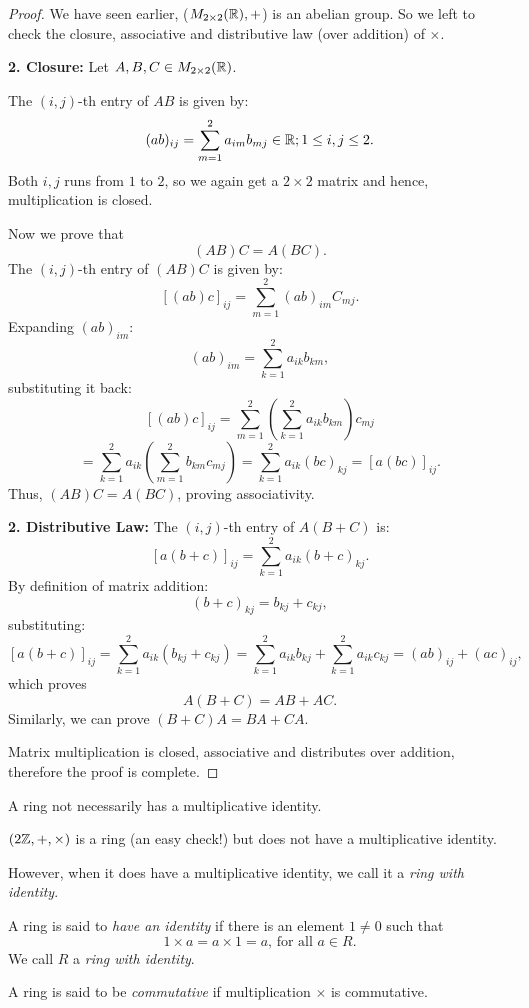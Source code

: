 \begin{proof}
    We have seen earlier, ($M_{2\times 2}(\mathbb{R}), +$) is an abelian group. So we left to check the closure, associative and distributive law (over addition) of $\times$.
    
    \textbf{2. Closure:} Let $A, B, C \in M_{2\times 2}(\mathbb{R})$.

    The $(i,j)$-th entry of $AB$ is given by:
    \[
    (ab)_{ij} = \sum_{m=1}^{2} a_{im} b_{mj} \in \mathbb{R}; 1 \leq i,j \leq 2.
    \]
    Both $i, j$ runs from $1$ to $2$, so we again get a $2\times 2$ matrix and hence, multiplication is closed.

    Now we prove that
    \[ (AB)C = A(BC). \]
    The $(i,j)$-th entry of $(AB)C$ is given by:
    \[
    [(ab)c]_{ij} = \sum_{m=1}^{2} (ab)_{im} C_{mj}.
    \]
    Expanding $(ab)_{im}$:
    \[
    (ab)_{im} = \sum_{k=1}^{2} a_{ik} b_{km},
    \]
    substituting it back:
    \[
    [(ab)c]_{ij} = \sum_{m=1}^{2} \left( \sum_{k=1}^{2} a_{ik} b_{km} \right) c_{mj}
    \]
    \[
    = \sum_{k=1}^{2} a_{ik} \left( \sum_{m=1}^{2} b_{km} c_{mj} \right) = \sum_{k=1}^{2} a_{ik} (bc)_{kj} = [a(bc)]_{ij}.
    \]
    Thus, $(AB)C = A(BC)$, proving associativity.

    \textbf{2. Distributive Law:} 
    The $(i,j)$-th entry of $A(B+C)$ is:
    \[
    [a(b+c)]_{ij} = \sum_{k=1}^{2} a_{ik} (b+c)_{kj}.
    \]
    By definition of matrix addition:
    \[
    (b+c)_{kj} = b_{kj} + c_{kj},
    \]
    substituting:
    \[
    [a(b+c)]_{ij} = \sum_{k=1}^{2} a_{ik} (b_{kj} + c_{kj}) = \sum_{k=1}^{2} a_{ik} b_{kj} + \sum_{k=1}^{2} a_{ik} c_{kj} = (ab)_{ij} + (ac)_{ij},
    \]
    which proves
    \[
    A(B+C) = AB + AC.
    \]
    Similarly, we can prove $(B+C)A = BA + CA$.

    Matrix multiplication is closed, associative and distributes over addition, therefore the proof is complete.

\end{proof}

A ring not necessarily has a multiplicative identity.
\begin{eg}
    $(2\mathbb{Z}, +, \times)$ is a ring (an easy check!) but does not have a multiplicative identity.
\end{eg}
However, when it does have a multiplicative identity, we call it a \textit{ring with identity}.
\begin{definition}
    A ring is said to \textit{have an identity} if there is an element $1 \neq 0$ such that 
    \[ 1 \times a = a \times 1 = a \text{, for all } a \in R.\]
    We call $R$ a \textit{ring with identity}.
\end{definition}
\begin{definition}
    A ring is said to be \textit{commutative} if multiplication $\times$ is commutative.
\end{definition}

